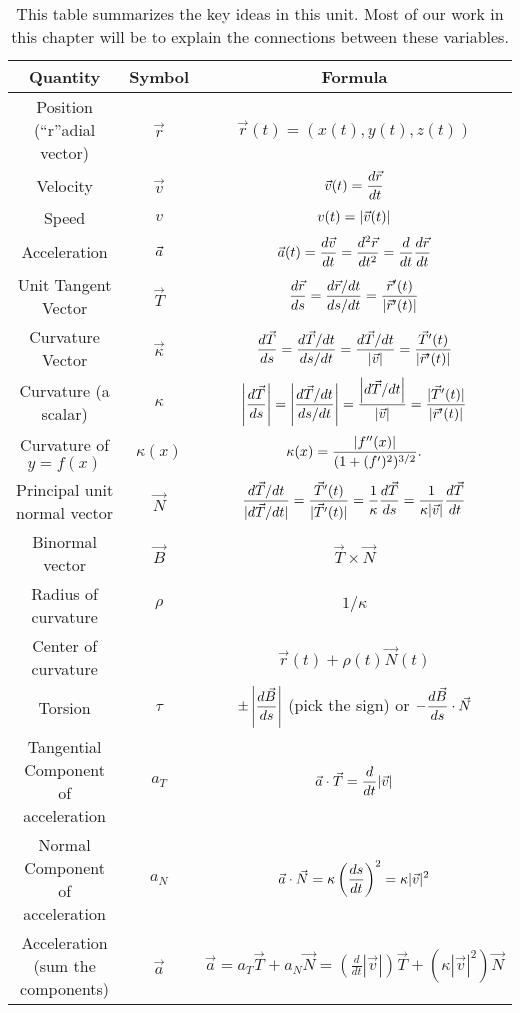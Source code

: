 \begin{table}
\begin{center}
\begin{tabular}{|c|c|c|}
\hline
Quantity & Symbol & Formula\\\hline\hline
Position (``r''adial vector) & $\vec r$ & $\vec r(t) = (x(t),y(t),z(t))$\\\hline
Velocity  & $\vec v$ & $\displaystyle \vec v(t) = \frac{d\vec r}{dt}$\\\hline
Speed  & $v$ & $\displaystyle v(t) = |\vec v(t)|$\\\hline
Acceleration  & $\displaystyle \vec a$ & $\displaystyle \vec a(t) = \frac{d \vec v}{dt}= \frac{d^2\vec r}{dt^2}= \frac{d}{dt}\frac{d\vec r}{dt}$\\\hline
Unit Tangent Vector & $\vec T$ & $\displaystyle\frac{d\vec r}{ds} = \frac{d\vec r/dt}{ds/dt} = \frac{\vec r^\prime(t)}{|\vec r^\prime(t)|}$\\\hline
Curvature Vector & $\vec \kappa $& $\displaystyle\frac{d\vec T}{ds} =\frac{d\vec T/dt}{ds/dt} = \frac{d\vec T/dt}{|\vec v|} = \frac{\vec T^\prime(t)}{|\vec r^\prime(t)|} $\\\hline
Curvature (a scalar)& $ \kappa $&$\displaystyle \left|\frac{d\vec T}{ds}\right| =\left|\frac{d\vec T/dt}{ds/dt}\right| = \frac{\left|d\vec T/dt\right|}{|\vec v|}= \frac{|\vec T^\prime(t)|}{|\vec r^\prime(t)|}  $ \\\hline
Curvature of $y=f(x)$& $ \kappa(x) $&$\displaystyle \kappa(x) = \frac{|f''(x)|}{(1+(f')^2)^{3/2}}.  $ \\\hline
Principal unit normal vector & $ \vec N$& $\displaystyle \frac{d\vec T/dt}{|d\vec T/dt|} =  \frac{\vec T^\prime(t)}{|\vec T^\prime(t)|}=\frac{1}{\kappa}\frac{d\vec T}{ds} = \frac{1}{\kappa |\vec v|}\frac{d\vec T}{dt}$\\\hline
Binormal vector & $ \vec B$& $ \vec T\times\vec N$\\\hline
Radius of curvature & $ \rho$ & $1/\kappa$\\\hline
Center of curvature &  & $\vec r(t)+\rho(t)\vec N(t)$ \\\hline
Torsion & $ \tau $ & $\displaystyle \pm\left|\frac{d\vec B}{ds}\right|$ (pick the sign) or $\displaystyle-\frac{d\vec B}{ds}\cdot \vec N $\\\hline
Tangential Component of acceleration & $ a_T$ & $\displaystyle \vec a \cdot \vec T = \frac{d}{dt}|\vec v|$\\\hline
Normal Component of acceleration & $ a_N$ & $\displaystyle \vec a \cdot \vec N = \kappa \left(\frac{ds}{dt}\right)^2 = \kappa |\vec v|^2$\\\hline
Acceleration (sum the components)& $ \vec a$ & 
$\vec a 
= a_T\vec T+a_N\vec N 
= \left(\frac{d}{dt}|\vec v|\right) \vec T 
 +\left(\kappa |\vec v|^2\right) \vec N  $\\\hline


\end{tabular}
\caption{This table summarizes the key ideas in this unit. Most of our work in this chapter will be to explain the connections between these variables.\label{motion table}} 
\end{center}
\end{table}


